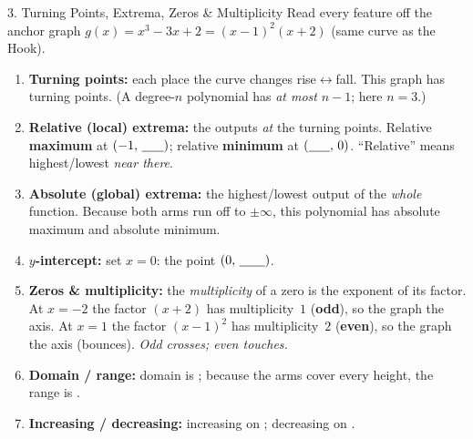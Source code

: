 \documentclass[10pt]{article}
\newcommand{\lgrid}[4]{%
  \draw[step=1, linegray!40, very thin] (#1,#3) grid (#2,#4);
  \draw[->, semithick, charcoal] (#1,0)--(#2,0) node[below right, font=\scriptsize]{$x$};
  \draw[->, semithick, charcoal] (0,#3)--(0,#4) node[left, font=\scriptsize]{$y$};}
\begin{document}
\begin{notesbox}{3. Turning Points, Extrema, Zeros \& Multiplicity}
Read every feature off the anchor graph $g(x)=x^3-3x+2=(x-1)^2(x+2)$ (same curve as the Hook).
\begin{center}
\end{center}
\begin{enumerate}[leftmargin=1.6em, itemsep=3pt]
  \item \textbf{Turning points:} each place the curve changes rise$\leftrightarrow$fall. This graph
        has \blank{0.8cm} turning points. (A degree-$n$ polynomial has \emph{at most} $n-1$; here
        $n=3$.)
  \item \textbf{Relative (local) extrema:} the outputs \emph{at} the turning points. Relative
        \textbf{maximum} at $(-1,\,\blank{0.6cm})$; relative \textbf{minimum} at
        $(\blank{0.6cm},\,0)$. ``Relative'' means highest/lowest \emph{near there}.
  \item \textbf{Absolute (global) extrema:} the highest/lowest output of the \emph{whole} function.
        Because both arms run off to $\pm\infty$, this polynomial has \blank{1.4cm} absolute
        maximum and \blank{1.4cm} absolute minimum.
  \item \textbf{$y$-intercept:} set $x=0$: the point $(0,\,\blank{0.7cm})$.
  \item \textbf{Zeros \& multiplicity:} the \emph{multiplicity} of a zero is the exponent of its
        factor. At $x=-2$ the factor $(x+2)$ has multiplicity~$1$ (\textbf{odd}), so the graph
        \blank{1.6cm} the axis. At $x=1$ the factor $(x-1)^2$ has multiplicity~$2$ (\textbf{even}),
        so the graph \blank{1.6cm} the axis (bounces). \emph{Odd crosses; even touches.}
  \item \textbf{Domain / range:} domain is \blank{2.6cm}; because the arms cover every height, the
        range is \blank{2.6cm}.
  \item \textbf{Increasing / decreasing:} increasing on \blank{3.6cm}; decreasing on \blank{2.0cm}.
\end{enumerate}
\end{notesbox}
\end{document}
